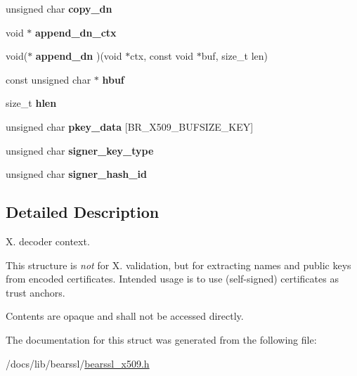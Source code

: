 \begin{DoxyCompactItemize}
\mbox{\label{structbr__x509__decoder__context_a34feeaaf55a31cc603154c199daeb322}} 
unsigned char {\bfseries copy\+\_\+dn}
\item 
\mbox{\label{structbr__x509__decoder__context_a0d469609fb95360702fde088d0599347}} 
void $\ast$ {\bfseries append\+\_\+dn\+\_\+ctx}
\item 
\mbox{\label{structbr__x509__decoder__context_ace3c38671e7b31941a2e3058a46eae8f}} 
void($\ast$ {\bfseries append\+\_\+dn} )(void $\ast$ctx, const void $\ast$buf, size\+\_\+t len)
\item 
\mbox{\label{structbr__x509__decoder__context_aa5b3cf692a211c94291f849994c6242e}} 
const unsigned char $\ast$ {\bfseries hbuf}
\item 
\mbox{\label{structbr__x509__decoder__context_addc9e6d099d84efef3ba34f1f4aead14}} 
size\+\_\+t {\bfseries hlen}
\item 
\mbox{\label{structbr__x509__decoder__context_ad1e7cc7d1a4c9f6d91ade443d6de88ca}} 
unsigned char {\bfseries pkey\+\_\+data} \mbox{[}B\+R\+\_\+\+X509\+\_\+\+B\+U\+F\+S\+I\+Z\+E\+\_\+\+K\+EY\mbox{]}
\item 
\mbox{\label{structbr__x509__decoder__context_af7c0ecac6f3900d8b1a0b582e3688724}} 
unsigned char {\bfseries signer\+\_\+key\+\_\+type}
\item 
\mbox{\label{structbr__x509__decoder__context_aa4484875be7f6cf83e8ddc236051d7ff}} 
unsigned char {\bfseries signer\+\_\+hash\+\_\+id}
\end{DoxyCompactItemize}


\subsection{Detailed Description}
X. decoder context. 

This structure is {\itshape not} for X. validation, but for extracting names and public keys from encoded certificates. Intended usage is to use (self-\/signed) certificates as trust anchors.

Contents are opaque and shall not be accessed directly. 

The documentation for this struct was generated from the following file\+:\begin{DoxyCompactItemize}
\item 
/docs/lib/bearssl/\hyperlink{bearssl__x509_8h}{bearssl\+\_\+x509.\+h}\end{DoxyCompactItemize}
